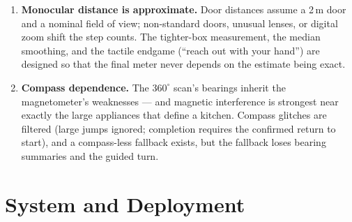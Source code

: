\begin{enumerate}[nosep]
        the system has instructed the user to walk --- not during scans or turns.
  \item \textbf{Monocular distance is approximate.} Door distances assume a
        2\,m door and a nominal field of view; non-standard doors, unusual
        lenses, or digital zoom shift the step counts. The tighter-box
        measurement, the median smoothing, and the tactile endgame (``reach out
        with your hand'') are designed so that the final meter never depends on
        the estimate being exact.
  \item \textbf{Compass dependence.} The $360^\circ$ scan's bearings inherit the
        magnetometer's weaknesses --- and magnetic interference is strongest
        near exactly the large appliances that define a kitchen. Compass
        glitches are filtered (large jumps ignored; completion requires the
        confirmed return to start), and a compass-less fallback exists, but the
        fallback loses bearing summaries and the guided turn.
\end{enumerate}

\section{System and Deployment}

